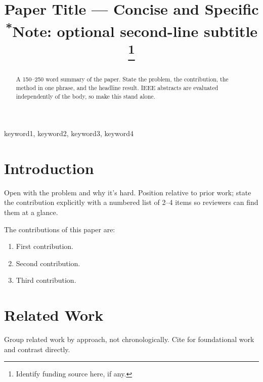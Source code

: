\documentclass[conference]{IEEEtran}
\begin{document}
\title{Paper Title — Concise and Specific\\
{\footnotesize \textsuperscript{*}Note: optional second-line subtitle}
\thanks{Identify funding source here, if any.}
}

\author{
  \and
}

\maketitle

\begin{abstract}
A 150–250 word summary of the paper. State the problem, the contribution, the method in one phrase, and the headline result. IEEE abstracts are evaluated independently of the body, so make this stand alone.
\end{abstract}

\begin{IEEEkeywords}
keyword1, keyword2, keyword3, keyword4
\end{IEEEkeywords}

\section{Introduction}
Open with the problem and why it's hard. Position relative to prior work; state the contribution explicitly with a numbered list of 2–4 items so reviewers can find them at a glance.

The contributions of this paper are:
\begin{enumerate}
\item First contribution.
\item Second contribution.
\item Third contribution.
\end{enumerate}

\section{Related Work}
Group related work by approach, not chronologically. Cite \cite{ref1} \cite{ref2} for foundational work and contrast directly.
\end{document}
